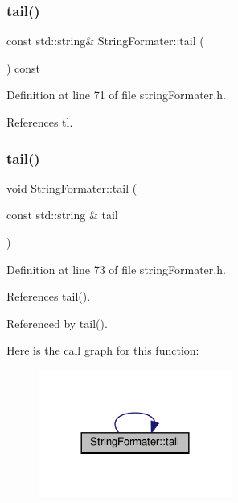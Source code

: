 \subsubsection{\texorpdfstring{tail()}{tail()}\hspace{0.1cm}{\footnotesize\ttfamily [1/2]}}
{\footnotesize\ttfamily const std\+::string\& String\+Formater\+::tail (\begin{DoxyParamCaption}{ }\end{DoxyParamCaption}) const\hspace{0.3cm}{\ttfamily [inline]}}



Definition at line 71 of file string\+Formater.\+h.



References tl.

\mbox{\label{classStringFormater_ab92f93d76b0f58560d8a8db124edd3ef}} 
\subsubsection{\texorpdfstring{tail()}{tail()}\hspace{0.1cm}{\footnotesize\ttfamily [2/2]}}
{\footnotesize\ttfamily void String\+Formater\+::tail (\begin{DoxyParamCaption}\item[{const std\+::string \&}]{tail }\end{DoxyParamCaption})\hspace{0.3cm}{\ttfamily [inline]}}



Definition at line 73 of file string\+Formater.\+h.



References tail().



Referenced by tail().

Here is the call graph for this function\+:
\nopagebreak
\begin{figure}[H]
\begin{center}
\leavevmode
\includegraphics[width=180pt]{classStringFormater_ab92f93d76b0f58560d8a8db124edd3ef_cgraph}
\end{center}
\end{figure}
\mbox{\label{classStringFormater_ae87101d7a35f7317fe0e48023f9033ca}} 
